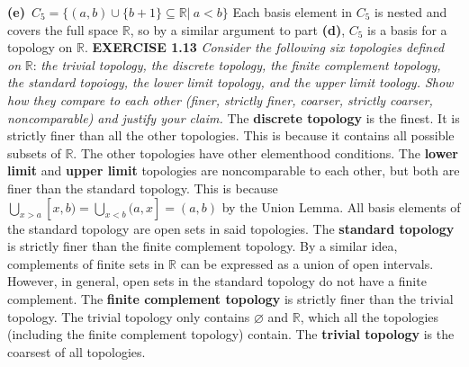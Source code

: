 \documentclass[12pt]{article}
\begin{document}
	\newline
	\newline
	\textbf{(e)}\ \(C_5 = \{(a,b)\cup \{b+1\}\subseteq \mathbb{R}|\ a < b\}\) \newline
	Each basis element in \(C_5\) is nested and covers the full space \(\mathbb{R}\), so by a similar argument to part \textbf{(d)}, \(C_5\) is a basis for a topology on \(\mathbb{R}\).
	\newline
	\newpage
	\noindent
	\textbf{EXERCISE 1.13} \textit{Consider the following six topologies defined on} \(\mathbb{R}\): \textit{the trivial topology, the discrete topology, the finite complement topology, the standard topoiogy, the lower limit topology, and the upper limit toology. Show how they compare to each other (finer, strictly finer, coarser, strictly coarser, noncomparable) and justify your claim.}
	\newline \newline
	The \textbf{discrete topology} is the finest. It is strictly finer than all the other topologies. This is because it contains all possible subsets of \(\mathbb{R}\). The other topologies have other elementhood conditions.
	\newline \newline
	The \textbf{lower limit} and \textbf{upper limit} topologies are noncomparable to each other, but both are finer than the standard topology. This is because \(\bigcup_{x>a} [x,b) = \bigcup_{x < b} (a,x] = (a,b)\) by the Union Lemma. All basis elements of the standard topology are open sets in said topologies.
	\newline \newline
	The \textbf{standard topology} is strictly finer than the finite complement topology. By a similar idea, complements of finite sets in \(\mathbb{R}\) can be expressed as a union of open intervals. However, in general, open sets in the standard topology do not have a finite complement.
	\newline \newline
	The \textbf{finite complement topology} is strictly finer than the trivial topology. The trivial topology only contains \(\varnothing\) and \(\mathbb{R}\), which all the topologies (including the finite complement topology) contain.
	\newline \newline
	The \textbf{trivial topology} is the coarsest of all topologies.
	\newline \newline
\end{document}
